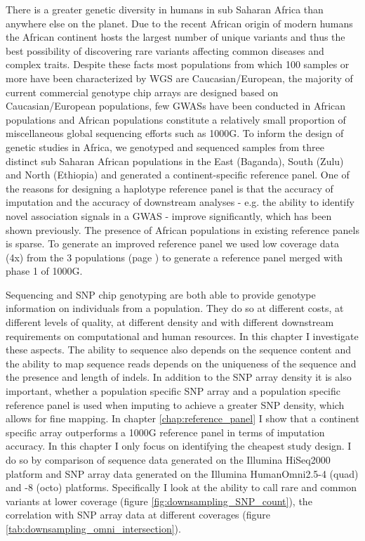 There is a greater genetic diversity in humans in sub Saharan Africa than anywhere else on the planet.\cite{Bowcock1994}\cite{Jorde1995}\cite{Tishkoff08031996}\cite{Jorde2000}\cite{Stephens2001}\cite{Tishkoff2002}\cite{Tishkoff2004}\cite{HapMap2005}\cite{Ramachandran01112005}\cite{Tishkoff22052009}\cite{1000G2010}\cite{1000G2012} Due to the recent African origin of modern humans the African continent hosts the largest number of unique variants and thus the best possibility of discovering rare variants affecting common diseases and complex traits. Despite these facts most populations from which 100 samples or more have been characterized by \gls{WGS} are Caucasian/European, the majority of current commercial genotype chip arrays are designed based on Caucasian/European populations, few \glspl{GWAS} have been conducted in African populations and African populations constitute a relatively small proportion of miscellaneous global sequencing efforts such as 1000G.\cite{1000G2012} To inform the design of genetic studies in Africa, we genotyped and sequenced samples from three distinct sub Saharan African populations in the East (Baganda), South (Zulu) and North (Ethiopia) and generated a continent-specific reference panel. One of the reasons for designing a haplotype reference panel is that the accuracy of imputation and the accuracy of downstream analyses - e.g. the ability to identify novel association signals in a \gls{GWAS} - improve significantly, which has been shown previously.\cite{2009Jallow}\cite{Gurdasani2015} The presence of African populations in existing reference panels is sparse. To generate an improved reference panel we used low coverage data (4x) from the 3 populations (page \pageref{sec:agv_data_description}) to generate a reference panel merged with phase 1 of 1000G.

Sequencing and \gls{SNP} chip genotyping are both able to provide genotype information on individuals from a population. They do so at different costs, at different levels of quality, at different density and with different downstream requirements on computational and human resources. In this chapter I investigate these aspects. The ability to sequence also depends on the sequence content and the ability to map sequence reads depends on the uniqueness of the sequence and the presence and length of indels. In addition to the \gls{SNP} array density it is also important, whether a population specific \gls{SNP} array and a population specific reference panel is used when imputing to achieve a greater SNP density, which allows for fine mapping. In chapter \ref{chap:reference_panel} I show that a continent specific array outperforms a 1000G reference panel in terms of imputation accuracy. In this chapter I only focus on identifying the cheapest study design. I do so by comparison of sequence data generated on the Illumina HiSeq2000 platform and SNP array data generated on the Illumina HumanOmni2.5-4 (quad) and -8 (octo) platforms. Specifically I look at the ability to call rare and common variants at lower coverage (figure \ref{fig:downsampling_SNP_count}), the correlation with SNP array data at different coverages (figure \ref{tab:downsampling_omni_intersection}).